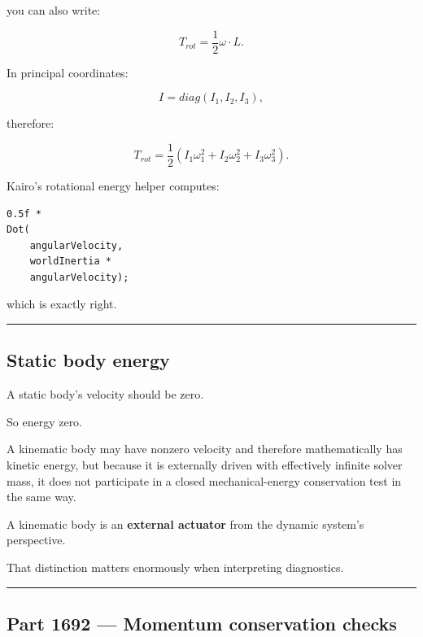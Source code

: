 you can also write:

\[
\boxed{
T_{rot}
=
\frac12
\omega\cdot L.
}
\]

In principal coordinates:

\[
I=
diag(I_1,I_2,I_3),
\]

therefore:

\[
T_{rot}
=
\frac12
(
I_1\omega_1^2+
I_2\omega_2^2+
I_3\omega_3^2
).
\]

Kairo's rotational energy helper computes:

\begin{verbatim}
0.5f *
Dot(
    angularVelocity,
    worldInertia *
    angularVelocity);
\end{verbatim}

which is exactly right.

\begin{center}\rule{0.5\linewidth}{0.5pt}\end{center}

\subsection{Static body energy}\label{06-engine-ii-ch039-static-body-energy}

\hypertarget{06-engine-ii-ch039-static-body-energy}{}

A static body's velocity should be zero.

So energy zero.

A kinematic body may have nonzero velocity and therefore mathematically has kinetic energy, but because it is externally driven with effectively infinite solver mass, it does not participate in a closed mechanical-energy conservation test in the same way.

A kinematic body is an \textbf{external actuator} from the dynamic system's perspective.

That distinction matters enormously when interpreting diagnostics.

\begin{center}\rule{0.5\linewidth}{0.5pt}\end{center}

\subsection{Part 1692 --- Momentum conservation checks}\label{06-engine-ii-ch039-part-1692-momentum-conservation-checks}

\hypertarget{06-engine-ii-ch039-part-1692-momentum-conservation-checks}{}

